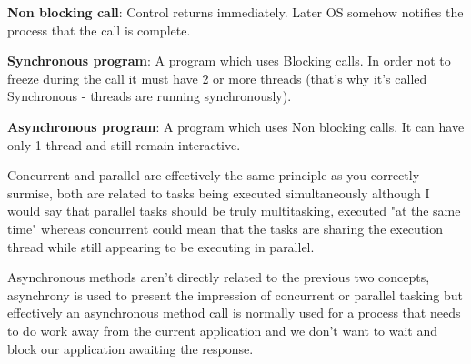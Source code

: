 \documentclass{article}
\begin{document}
\textbf{Non blocking call}: Control returns immediately. Later OS somehow notifies the process that the call is complete.

\textbf{Synchronous program}: A program which uses Blocking calls. In order not to freeze during the call it must have 2 or more threads (that's why it's called Synchronous - threads are running synchronously).

\textbf{Asynchronous program}: A program which uses Non blocking calls. It can have only 1 thread and still remain interactive.

Concurrent and parallel are effectively the same principle as you correctly surmise, both are related to tasks being executed simultaneously although I would say that parallel tasks should be truly multitasking, executed "at the same time" whereas concurrent could mean that the tasks are sharing the execution thread while still appearing to be executing in parallel.

Asynchronous methods aren't directly related to the previous two concepts, asynchrony is used to present the impression of concurrent or parallel tasking but effectively an asynchronous method call is normally used for a process that needs to do work away from the current application and we don't want to wait and block our application awaiting the response.
\end{document}
